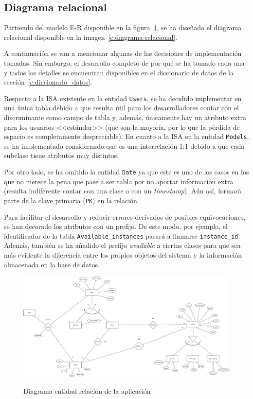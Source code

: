\subsection{Diagrama relacional}
\label{c:diagrama_relacional}

Partiendo del modelo E-R disponible en la figura~\ref{c:diagrama-er}, se ha diseñado el diagrama relacional disponible en la imagen~\ref{c:diagrama-relacional}.

A continuación se van a mencionar algunas de las decisiones de implementación tomadas. Sin embargo, el desarrollo completo de por qué se ha tomado cada una y todos los detalles se encuentran disponibles en el diccionario de datos de la sección~\ref{c:diccionario_datos}.

Respecto a la ISA existente en la entidad \texttt{Users}, se ha decidido implementar en una única tabla debido a que resulta útil para los desarrolladores contar con el discriminante como campo de tabla y, además, únicamente hay un atributo extra para los usuarios <<estándar>> (que son la mayoría, por lo que la pérdida de espacio es completamente despreciable). En cuanto a la ISA en la entidad \texttt{Models}, se ha implementado considerando que es una interrelación 1:1 debido a que cada subclase tiene atributos muy distintos.

Por otro lado, se ha omitido la entidad \texttt{Date} ya que este es uno de los casos en los que no merece la pena que pase a ser tabla por no aportar información extra (resulta indiferente contar con una clase o con un \textit{timestamp}). Aún así, formará parte de la clave primaria (\texttt{PK}) en la relación.

Para facilitar el desarrollo y reducir errores derivados de posibles equivocaciones, se han decorado los atributos con un prefijo. De este modo, por ejemplo, el identificador de la tabla \texttt{Available\_instances} pasará a llamarse \texttt{instance\_id}. Además, también se ha añadido el prefijo \textit{available} a ciertas clases para que sea más evidente la diferencia entre los propios objetos del sistema y la información almacenada en la base de datos.


\begin{landscape}
\begin{figure}[h]
	\caption[Diagrama: entidad-relación]{Diagrama entidad relación de la aplicación}
	\centering
	\includegraphics[scale=0.4]{../img/anexos/diagrams/er}
	\label{c:diagrama-er}
\end{figure}
\end{landscape}

